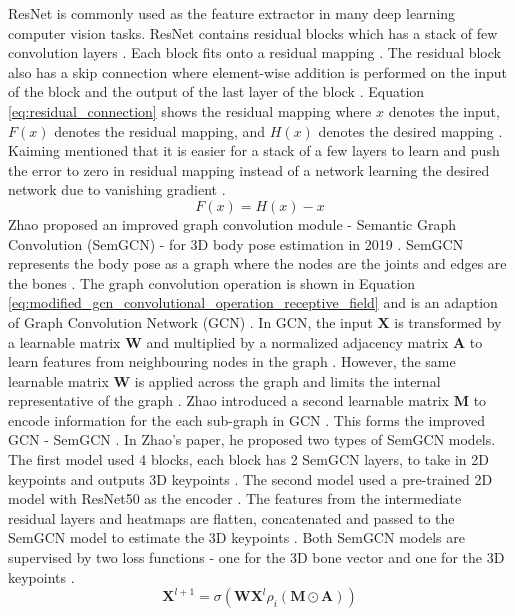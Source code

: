 \noindent
ResNet is commonly used as the feature extractor in many deep learning computer vision tasks. ResNet contains residual blocks which has a stack of few convolution layers \cite{resnet}. Each block fits onto a residual mapping \cite{resnet}. The residual block also has a skip connection where element-wise addition is performed on the input of the block and the output of the last layer of the block \cite{resnet}.  Equation \ref{eq:residual_connection} shows the residual mapping where \(x\) denotes the input, \(F(x)\) denotes the residual mapping, and \(H(x)\) denotes the desired mapping \cite{resnet}. Kaiming mentioned that it is easier for a stack of a few layers to learn and push the error to zero in residual mapping instead of a network learning the desired network due to vanishing gradient \cite{resnet}.
\begin{equation}
F(x) = H(x) - x \label{eq:residual_connection}
\end{equation}
\noindent
Zhao proposed an improved graph convolution module - Semantic Graph Convolution (SemGCN) - for 3D body pose estimation in 2019 \cite{semgcn}. SemGCN represents the body pose as a graph where the nodes are the joints and edges are the bones \cite{semgcn}. The graph convolution operation is shown in Equation \ref{eq:modified_gcn_convolutional_operation_receptive_field} and is an adaption of Graph Convolution Network (GCN) \cite{semgcn}. In GCN, the input \(\mathbf{X}\) is transformed by a learnable matrix \(\mathbf{W}\) and multiplied by a normalized adjacency matrix \(\mathbf{A}\) to learn features from neighbouring nodes in the graph \cite{semgcn}. However, the same learnable matrix \(\mathbf{W}\) is applied across the graph and limits the internal representative of the graph \cite{semgcn}. Zhao introduced a second learnable matrix \(\mathbf{M}\) to encode information for the each sub-graph in GCN \cite{semgcn}. This forms the improved GCN - SemGCN \cite{semgcn}. In Zhao's paper, he proposed two types of SemGCN models. The first model used 4 blocks, each block has 2 SemGCN layers, to take in 2D keypoints and outputs 3D keypoints \cite{semgcn}. The second model used a pre-trained 2D model with  ResNet50 as the encoder \cite{semgcn}. The features from the intermediate residual layers and heatmaps are flatten, concatenated and passed to the SemGCN model to estimate the 3D keypoints \cite{semgcn}. Both SemGCN models are supervised by two loss functions - one for the 3D bone vector and one for the 3D keypoints \cite{semgcn}.
\begin{equation}
\mathbf{X}^{l+1}=\sigma(\mathbf{W}\mathbf{X}^{l}\rho_i(\mathbf{M}\odot\mathbf{A})) \label{eq:modified_gcn_convolutional_operation_receptive_field}
\end{equation}
